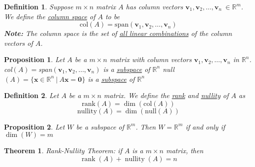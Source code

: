 \documentclass{article}
\theoremstyle{definitionstyle}
\newtheorem{definition}{Definition}[section]
\newtheorem{theorem}{Theorem}[section]
\newtheorem{proposition}{Proposition}[section]
\begin{document}
\begin{definition}
    Suppose $m \times n$ matrix $A$ has column vectors $\mathbf{v}_1,\mathbf{v}_2,\dots,\mathbf{v}_n\ \in \mathbb{R}^m$.
    We define the \underline{column space} of $A$ to be
    \begin{equation*}
        \mathrm{col}(A)=\mathrm{span}(\mathbf{v}_1,\mathbf{v}_2,\dots,\mathbf{v}_n)
    \end{equation*}
    \textbf{Note:} The column space is the set of \underline{all linear combinations} of the column vectors of $A$.
\end{definition}

\begin{proposition}
    Let $A$ be a $m \times n$ matrix with column vectors $\mathbf{v}_1,\mathbf{v}_2,\dots,\mathbf{v}_n$ in $\mathbb{R}^n$.
    \newline\newline
    col$(A)=$span$(\mathbf{v}_1,\mathbf{v}_2,\dots,\mathbf{v}_n)$ is a \underline{subspace} of $\mathbb{R}^n$
    \newline\newline
    null$(A)=\{\mathbf{x} \in \mathbb{R}^n \ |\ A\mathbf{x}=\mathbf{0}\}$ is a \underline{subspace} of $\mathbb{R}^n$
\end{proposition}

\begin{definition}
    Let $A$ be a $m \times n$ matrix. We define the \underline{rank} and \underline{nullity} of $A$ as
    \begin{equation*}
        \mathrm{rank}(A)=\dim(\mathrm{col}(A))
    \end{equation*}
    \begin{equation*}
        \mathrm{nullity}(A)=\dim(\mathrm{null}(A))
    \end{equation*}
\end{definition}

\begin{proposition}
    Let $W$ be a subspace of $\mathbb{R}^m$. Then $W=\mathbb{R}^m$
    if and only if $\dim(W)=m$
\end{proposition}

\begin{theorem}
    \textit{Rank-Nullity Theorem:} if $A$ is a $m \times n$ matrix, then
    \begin{equation*}
        \operatorname*{rank}(A)+\operatorname*{nullity}(A)=n
    \end{equation*}
\end{theorem}
\end{document}
